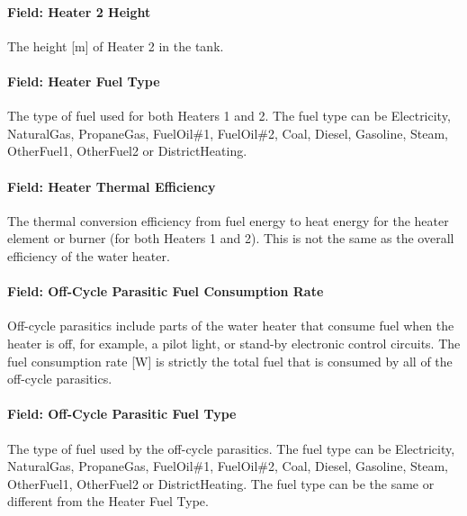 \paragraph{Field: Heater 2 Height}\label{field-heater-2-height}

The height {[}m{]} of Heater 2 in the tank.

\paragraph{Field: Heater Fuel Type}\label{field-heater-fuel-type-1}

The type of fuel used for both Heaters 1 and 2. The fuel type can be Electricity, NaturalGas, PropaneGas, FuelOil\#1, FuelOil\#2, Coal, Diesel, Gasoline, Steam, OtherFuel1, OtherFuel2 or DistrictHeating.

\paragraph{Field: Heater Thermal Efficiency}\label{field-heater-thermal-efficiency-1}

The thermal conversion efficiency from fuel energy to heat energy for the heater element or burner (for both Heaters 1 and 2). This is not the same as the overall efficiency of the water heater.

\paragraph{Field: Off-Cycle Parasitic Fuel Consumption Rate}\label{field-off-cycle-parasitic-fuel-consumption-rate-1}

Off-cycle parasitics include parts of the water heater that consume fuel when the heater is off, for example, a pilot light, or stand-by electronic control circuits. The fuel consumption rate {[}W{]} is strictly the total fuel that is consumed by all of the off-cycle parasitics.

\paragraph{Field: Off-Cycle Parasitic Fuel Type}\label{field-off-cycle-parasitic-fuel-type-1}

The type of fuel used by the off-cycle parasitics. The fuel type can be Electricity, NaturalGas, PropaneGas, FuelOil\#1, FuelOil\#2, Coal, Diesel, Gasoline, Steam, OtherFuel1, OtherFuel2 or DistrictHeating. The fuel type can be the same or different from the Heater Fuel Type.

